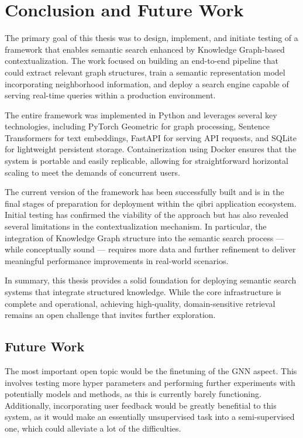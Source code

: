 \documentclass[draft,final]{vutinfth} %
\begin{document}
\chapter{Conclusion and Future Work} \label{chap:conclusion}
The primary goal of this thesis was to design, implement, and initiate testing of a framework that enables semantic search enhanced by Knowledge Graph-based contextualization. The work focused on building an end-to-end pipeline that could extract relevant graph structures, train a semantic representation model incorporating neighborhood information, and deploy a search engine capable of serving real-time queries within a production environment.

The entire framework was implemented in Python and leverages several key technologies, including PyTorch Geometric for graph processing, Sentence Transformers for text embeddings, FastAPI for serving API requests, and SQLite for lightweight persistent storage. Containerization using Docker ensures that the system is portable and easily replicable, allowing for straightforward horizontal scaling to meet the demands of concurrent users.

The current version of the framework has been successfully built and is in the final stages of preparation for deployment within the qibri application ecosystem. Initial testing has confirmed the viability of the approach but has also revealed several limitations in the contextualization mechanism. In particular, the integration of Knowledge Graph structure into the semantic search process — while conceptually sound — requires more data and further refinement to deliver meaningful performance improvements in real-world scenarios.

In summary, this thesis provides a solid foundation for deploying semantic search systems that integrate structured knowledge. While the core infrastructure is complete and operational, achieving high-quality, domain-sensitive retrieval remains an open challenge that invites further exploration.

\section{Future Work}
The most important open topic would be the finetuning of the GNN aspect. This involves testing more hyper parameters and performing further experiments with potentially models and methods, as this is currently barely functioning. Additionally, incorporating user feedback would be greatly benefitial to this system, as it would make an essentially unsupervised task into a semi-supervised one, which could alleviate a lot of the difficulties. 
\end{document}
